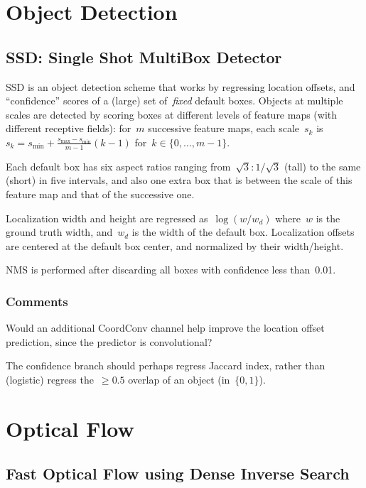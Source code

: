 \documentclass[a4paper, 12pt]{article}
\begin{document}
\section{Object Detection}


\subsection{SSD\@: Single Shot MultiBox Detector~\cite{liu2016ssd}}

SSD is an object detection scheme that works by regressing location offsets,
and ``confidence'' scores of a (large) set of~\emph{fixed} default boxes.
Objects at multiple scales are detected by scoring boxes at different levels of
feature maps (with different receptive fields): for~$m$ successive feature
maps, each scale~$s_k$
is~$s_k = s_{\textrm{min}} + \frac{s_{\textrm{max}} - s_{\textrm{min}}}{m - 1}(k - 1)$
for~$k \in \{0, \dots, m - 1\}$.

Each default box has six aspect ratios ranging from~$\sqrt{3}:1/\sqrt{3}$
(tall) to the same (short) in five intervals, and also one extra box that is
between the scale of this feature map and that of the successive one.

Localization width and height are regressed as~$\log(w/w_d)$ where~$w$ is the
ground truth width, and~$w_d$ is the width of the default box. Localization
offsets are centered at the default box center, and normalized by their
width/height.

NMS is performed after discarding all boxes with confidence less
than~\num{0.01}.


\subsubsection{Comments}

Would an additional CoordConv channel help improve the location offset
prediction, since the predictor is convolutional?

The confidence branch should perhaps regress Jaccard index, rather than
(logistic) regress the~$\geq 0.5$ overlap of an object (in~$\{0, 1\}$).


\section{Optical Flow}


\subsection{Fast Optical Flow using Dense Inverse
            Search~\cite{kroeger2016fast}}
\end{document}
